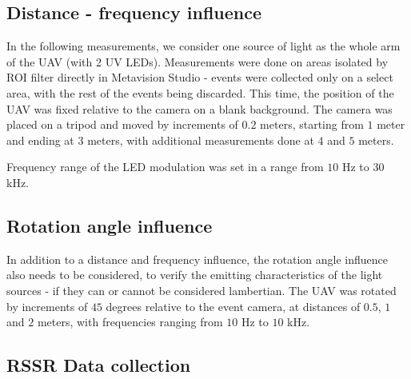 \subsection{Distance - frequency influence}

In the following measurements, we consider one source of light as the whole arm of the UAV (with 2 UV LEDs). Measurements were
done on areas isolated by ROI filter directly in Metavision Studio - events were collected only on a select area, with the
rest of the events being discarded.
This time, the position of the UAV was fixed relative to the camera on a blank background. The camera was placed on a tripod
and moved by increments of $0.2$ meters, starting from $1$ meter and ending at $3$ meters, with additional measurements done
at $4$ and $5$ meters.

Frequency range of the LED modulation was set in a range from $10$ Hz to $30$ kHz.

\subsection{Rotation angle influence}

In addition to a distance and frequency influence, the rotation angle influence also needs to be considered, to
verify the emitting characteristics of the light sources - if they can or cannot be considered lambertian.
The UAV was rotated by increments of $45$ degrees relative to the event camera, at distances of $0.5$, $1$ and $2$ meters,
with frequencies ranging from $10$ Hz to $10$ kHz. 

\subsection{RSSR Data collection}

